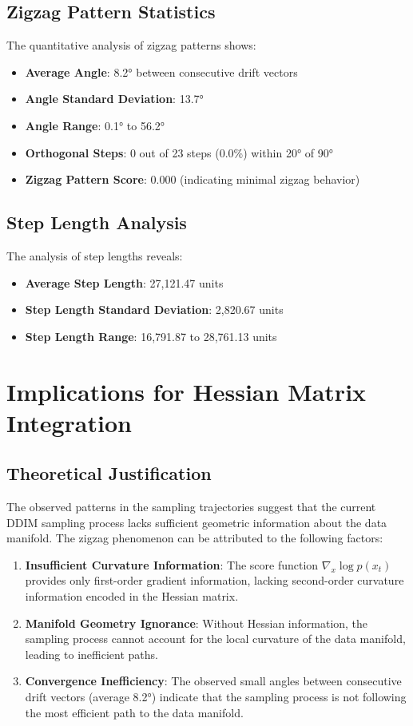 \documentclass[11pt]{article}
\begin{document}
\subsection{Zigzag Pattern Statistics}
The quantitative analysis of zigzag patterns shows:

\begin{itemize}
\item \textbf{Average Angle}: 8.2° between consecutive drift vectors
\item \textbf{Angle Standard Deviation}: 13.7°
\item \textbf{Angle Range}: 0.1° to 56.2°
\item \textbf{Orthogonal Steps}: 0 out of 23 steps (0.0\%) within 20° of 90°
\item \textbf{Zigzag Pattern Score}: 0.000 (indicating minimal zigzag behavior)
\end{itemize}

\subsection{Step Length Analysis}
The analysis of step lengths reveals:

\begin{itemize}
\item \textbf{Average Step Length}: 27,121.47 units
\item \textbf{Step Length Standard Deviation}: 2,820.67 units
\item \textbf{Step Length Range}: 16,791.87 to 28,761.13 units
\end{itemize}

\section{Implications for Hessian Matrix Integration}

\subsection{Theoretical Justification}
The observed patterns in the sampling trajectories suggest that the current DDIM sampling process lacks sufficient geometric information about the data manifold. The zigzag phenomenon can be attributed to the following factors:

\begin{enumerate}
\item \textbf{Insufficient Curvature Information}: The score function $\nabla_x \log p(x_t)$ provides only first-order gradient information, lacking second-order curvature information encoded in the Hessian matrix.

\item \textbf{Manifold Geometry Ignorance}: Without Hessian information, the sampling process cannot account for the local curvature of the data manifold, leading to inefficient paths.

\item \textbf{Convergence Inefficiency}: The observed small angles between consecutive drift vectors (average 8.2°) indicate that the sampling process is not following the most efficient path to the data manifold.
\end{enumerate}
\end{document}
